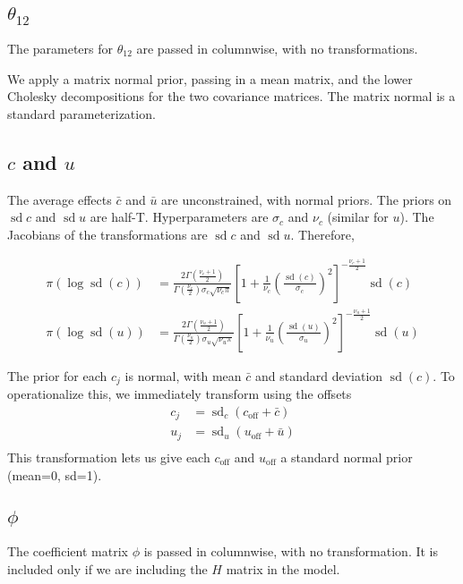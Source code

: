 \documentclass[letter,11pt]{article}
\DeclareMathOperator\sd{sd}
\newcommand{\off}{\text{off}}
\begin{document}
\subsection{$\theta_{12}$}
The parameters for $\theta_{12}$ are passed in columnwise, with no
transformations. 

We apply a matrix normal prior, passing in a mean matrix, and the
lower Cholesky decompositions for the two covariance matrices.  The
matrix normal is a standard parameterization.

\subsection{$c$ and $u$}

The average effects $\bar{c}$ and $\bar{u}$ are unconstrained, with
normal priors.  The priors on $\sd{c}$ and $\sd{u}$ are
half-T. Hyperparameters are $\sigma_c$ and $\nu_c$ (similar for $u$). The
Jacobians of the transformations are $\sd{c}$ and $\sd{u}$.
Therefore,

\begin{align}
  \label{eq:2}
  \pi(\log\sd(c))&=\frac{2\Gamma(\frac{\nu_c+1}{2})}{\Gamma(\frac{\nu_c}{2})\sigma_c\sqrt{\nu_c\pi}}
\left[1+\frac{1}{\nu_c}\left(\frac{\sd(c)}{\sigma_c}\right)^2\right]^{-\frac{\nu_c+1}{2}}\sd(c)\\
  \pi(\log\sd(u))&=\frac{2\Gamma(\frac{\nu_u+1}{2})}{\Gamma(\frac{\nu_u}{2})\sigma_u\sqrt{\nu_u\pi}}
\left[1+\frac{1}{\nu_u}\left(\frac{\sd(u)}{\sigma_u}\right)^2\right]^{-\frac{\nu_u+1}{2}}\sd(u)
\end{align}

The prior for each $c_j$ is normal, with mean $\bar{c}$ and standard
deviation $\sd(c)$.  To operationalize this, we immediately transform
using the offsets
\begin{align}
  \label{eq:3}
  c_j&=\sd_c\left(c_{\off}+\bar{c}\right)\\
  u_j&=\sd_u\left(u_{\off}+\bar{u}\right)\\
\end{align}
This transformation lets us give each $c_{\off}$ and $u_{\off}$ a standard
normal prior (mean=0, sd=1).

\subsection{$\phi$}
The coefficient matrix $\phi$ is passed in columnwise, with no
transformation.  It is included only if we are including the $H$
matrix in the model.
\end{document}
